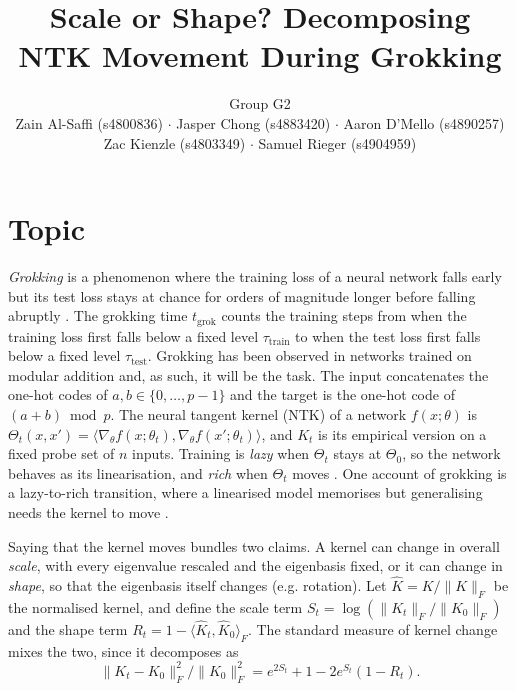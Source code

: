\documentclass[a4paper,11pt]{article} %
\newcommand{\Kh}{\widehat{K}}
\newcommand{\Fnorm}[1]{\lVert #1 \rVert_F}
\newcommand{\tgrok}{t_{\mathrm{grok}}}
\begin{document}
\title{Scale or Shape? Decomposing NTK Movement During Grokking}
\author{Group G2 \\
Zain Al-Saffi (s4800836) $\cdot$
Jasper Chong (s4883420) $\cdot$
Aaron D'Mello (s4890257) \\
Zac Kienzle (s4803349) $\cdot$ Samuel Rieger (s4904959)}

\date{}
\maketitle
\section{Topic}

\emph{Grokking} is a phenomenon where the training loss of a neural network
falls early but its test loss stays at chance for orders of magnitude longer
before falling abruptly \citep{power2022grokking}. The grokking time $\tgrok$ counts
the training steps from when the training loss first falls below a fixed level
$\tau_{\mathrm{train}}$ to when the test loss first falls below a fixed level
$\tau_{\mathrm{test}}$. Grokking has been observed in networks trained on modular addition and, as such, it will be the task. The input concatenates the one-hot codes of $a,b\in\{0,\dots,p-1\}$ and the target is the one-hot code of $(a+b)\bmod p$. The neural tangent kernel (NTK)
of a network $f(x;\theta)$ is
$\Theta_t(x,x')=\langle\nabla_\theta f(x;\theta_t),\nabla_\theta f(x';\theta_t)\rangle$,
and $K_t$ is its empirical version on a fixed probe set of $n$ inputs.
Training is \emph{lazy} when $\Theta_t$ stays at $\Theta_0$, so the network
behaves as its linearisation, and \emph{rich} when $\Theta_t$ moves
\citep{jacot2018ntk,chizat2019lazy}. One account of grokking is a lazy-to-rich transition, where a linearised model memorises but generalising needs
the kernel to move \citep{kumar2024grokking, mohamadi2024grok}.

Saying that the kernel moves bundles two claims. A
kernel can change in overall \emph{scale}, with every eigenvalue rescaled and
the eigenbasis fixed, or it can change in \emph{shape}, so that the eigenbasis itself
changes (e.g. rotation). Let $\Kh=K/\Fnorm{K}$ be the normalised kernel, and define the scale
term $S_t=\log(\Fnorm{K_t}/\Fnorm{K_0})$ and the shape term
$R_t=1-\langle\Kh_t,\Kh_0\rangle_F$. The standard measure of kernel change
mixes the two, since it decomposes as
\begin{equation}
  \Fnorm{K_t-K_0}^2\big/\Fnorm{K_0}^2 = e^{2S_t}+1-2e^{S_t}(1-R_t).
  \label{eq:decomp}
\end{equation}
\end{document}
